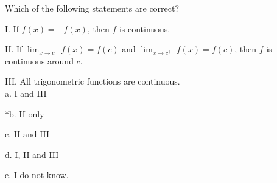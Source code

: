 
Which of the following statements are correct?

I. If \(f(x)= -f(x)\), then \(f\) is continuous.

II. If \(\displaystyle\lim_{x \to c^-} f(x)=f(c)\) and \(\displaystyle\lim_{x \to c^+}\ f(x)=f(c)\), then \(f\) is continuous around \(c\).

III. All trigonometric functions are continuous.\\

a. I and III

*b. II only

c. II and III

d. I, II and III

e. I do not know.\\
